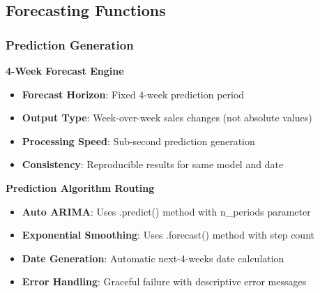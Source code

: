 \subsection{Forecasting Functions}

\subsubsection{Prediction Generation}

\textbf{4-Week Forecast Engine}
\begin{itemize}
	\item \textbf{Forecast Horizon}: Fixed 4-week prediction period
	\item \textbf{Output Type}: Week-over-week sales changes (not absolute values)
	\item \textbf{Processing Speed}: Sub-second prediction generation
	\item \textbf{Consistency}: Reproducible results for same model and date
\end{itemize}

\textbf{Prediction Algorithm Routing}
\begin{itemize}
	\item \textbf{Auto ARIMA}: Uses .predict() method with n\_periods parameter
	\item \textbf{Exponential Smoothing}: Uses .forecast() method with step count
	\item \textbf{Date Generation}: Automatic next-4-weeks date calculation
	\item \textbf{Error Handling}: Graceful failure with descriptive error messages
\end{itemize}

